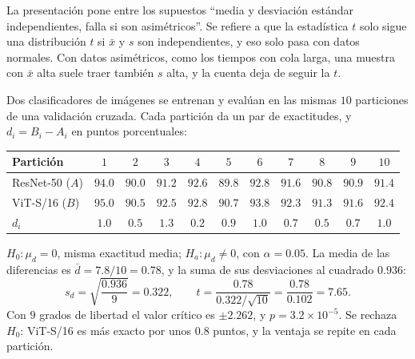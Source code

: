 \documentclass[11pt,letterpaper]{article}
\begin{document}
La presentación pone entre los supuestos ``media y desviación estándar
independientes, falla si son asimétricos''. Se refiere a que la
estadística $t$ solo sigue una distribución $t$ si $\bar{x}$ y $s$ son
independientes, y eso solo pasa con datos normales. Con datos
asimétricos, como los tiempos con cola larga, una muestra con $\bar{x}$
alta suele traer también $s$ alta, y la cuenta deja de seguir la $t$.

\begin{ejemplo}
    Dos clasificadores de imágenes se entrenan y evalúan en las mismas
    $10$ particiones de una validación cruzada. Cada partición da un
    par de exactitudes, y $d_i = B_i - A_i$ en puntos porcentuales:
    \begin{center}
    \small
    \begin{tabular}{lcccccccccc}
        \toprule
        Partición & $1$ & $2$ & $3$ & $4$ & $5$ & $6$ & $7$ & $8$
                  & $9$ & $10$ \\
        \midrule
        ResNet-50 ($A$) & $94.0$ & $90.0$ & $91.2$ & $92.6$ & $89.8$
                        & $92.8$ & $91.6$ & $90.8$ & $90.9$ & $91.4$ \\
        ViT-S/16 ($B$) & $95.0$ & $90.5$ & $92.5$ & $92.8$ & $90.7$
                       & $93.8$ & $92.3$ & $91.3$ & $91.6$ & $92.4$ \\
        $d_i$ & $1.0$ & $0.5$ & $1.3$ & $0.2$ & $0.9$ & $1.0$ & $0.7$
              & $0.5$ & $0.7$ & $1.0$ \\
        \bottomrule
    \end{tabular}
    \end{center}
    $H_0\colon \mu_d = 0$, misma exactitud media; $H_a\colon
    \mu_d \neq 0$, con $\alpha = 0.05$. La media de las diferencias es
    $\bar{d} = 7.8 / 10 = 0.78$, y la suma de sus desviaciones al
    cuadrado $0.936$:
    \[
        s_d = \sqrt{\frac{0.936}{9}} = 0.322 ,
        \qquad
        t = \frac{0.78}{0.322 / \sqrt{10}} = \frac{0.78}{0.102}
          = 7.65 .
    \]
    Con $9$ grados de libertad el valor crítico es $\pm 2.262$, y
    $p = 3.2 \times 10^{-5}$. Se rechaza $H_0$: ViT-S/16 es más exacto
    por unos $0.8$ puntos, y la ventaja se repite en cada partición.
\end{ejemplo}
\end{document}
